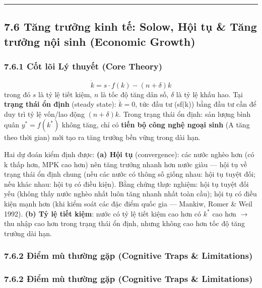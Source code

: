 \documentclass[
]{article}
\begin{document}
\begin{center}\rule{0.5\linewidth}{0.5pt}\end{center}

\subsection{7.6 Tăng trưởng kinh tế: Solow, Hội tụ \& Tăng trưởng nội
sinh (Economic
Growth)}\label{tux103ng-trux1b0ux1edfng-kinh-tux1ebf-solow-hux1ed9i-tux1ee5-tux103ng-trux1b0ux1edfng-nux1ed9i-sinh-economic-growth}

\subsubsection{7.6.1 Cốt lõi Lý thuyết (Core
Theory)}\label{cux1ed1t-luxf5i-luxfd-thuyux1ebft-core-theory-21}

\[ \dot{k} = s \cdot f(k) - (n + \delta)k \] trong đó \(s\) là tỷ lệ
tiết kiệm, \(n\) là tốc độ tăng dân số, \(\delta\) là tỷ lệ khấu hao.
Tại \textbf{trạng thái ổn định} (steady state): \(\dot{k} = 0\), tức đầu
tư (sf(k)) bằng đầu tư cần để duy trì tỷ lệ vốn/lao động
\((n+\delta)k\). Trong trạng thái ổn định: sản lượng bình quân
\(y^* = f(k^*)\) không tăng, chỉ có \textbf{tiến bộ công nghệ ngoại
sinh} (A tăng theo thời gian) mới tạo ra tăng trưởng bền vững trong dài
hạn.

Hai dự đoán kiểm định được: \textbf{(a) Hội tụ} (convergence): các nước
nghèo hơn (có k thấp hơn, MPK cao hơn) nên tăng trưởng nhanh hơn nước
giàu --- hội tụ về trạng thái ổn định chung (nếu các nước có thông số
giống nhau: hội tụ tuyệt đối; nếu khác nhau: hội tụ có điều kiện). Bằng
chứng thực nghiệm: hội tụ tuyệt đối yếu (không thấy nước nghèo nhất luôn
tăng nhanh nhất toàn cầu); hội tụ có điều kiện mạnh hơn (khi kiểm soát
các đặc điểm quốc gia --- Mankiw, Romer \& Weil 1992). \textbf{(b) Tỷ lệ
tiết kiệm}: nước có tỷ lệ tiết kiệm cao hơn có \(k^*\) cao hơn
\(\rightarrow\) thu nhập cao hơn trong trạng thái ổn định, nhưng không
cao hơn tốc độ tăng trưởng dài hạn.

\subsubsection{7.6.2 Điểm mù thường gặp (Cognitive Traps \&
Limitations)}\label{ux111iux1ec3m-muxf9-thux1b0ux1eddng-gux1eb7p-cognitive-traps-limitations-41}

\subsubsection{7.6.2 Điểm mù thường gặp (Cognitive Traps \&
Limitations)}\label{ux111iux1ec3m-muxf9-thux1b0ux1eddng-gux1eb7p-cognitive-traps-limitations-42}
\end{document}

